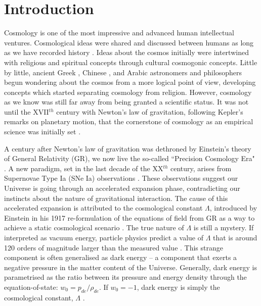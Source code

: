 %
\chapter{Introduction}
\label{sec:intro}


Cosmology is one of the most impressive and advanced human intellectual ventures. Cosmological ideas were shared and discussed between humans as long as we have recorded history \citep{preBabylonianCosmology,BabylonianCosmology1}. Ideas about the cosmos initially were intertwined with religious and spiritual concepts through cultural cosmogonic %
concepts. Little by little, ancient Greek \citep{GreekCosmology}, Chinese \citep{ChineseCosmology}, and Arabic \citep{ArabicCosmology} astronomers and philosophers begun wondering about the cosmos from a more logical point of view, developing concepts which started separating cosmology from religion. However, cosmology as we know was still far away from being granted a scientific status. It was not until the XVII$^{th}$ century with Newton's law of gravitation, following Kepler's remarks on planetary motion, that the cornerstone of cosmology as an empirical science was initially set \citep{Gleiser}.

\qquad A century after Newton's law of gravitation was dethroned by Einstein's theory of General Relativity (GR), we now live the so-called ``Precision Cosmology Era" \citep{2005PrecisionCosmology}. A new paradigm, set in the last decade of the XX$^{th}$ century, arises from Supernovae Type Ia (SNe Ia) observations \citep{1998Riess,1999Perlmutter}. These observations suggest our Universe is going through an accelerated expansion phase, contradicting our instincts about the nature of gravitational interaction. The cause of this accelerated expansion is attributed to the cosmological constant $\Lambda$, introduced by Einstein in his 1917 re-formulation of the equations of field from GR as a way to achieve a static cosmological scenario \citep{1917Einstein}. The true nature of $\Lambda$ is still a mystery. If interpreted as vacuum energy, particle physics predict a value of $\Lambda$ that is around 120 orders of magnitude larger than the measured value \citep{2018LambdaCentury}. This strange component is often generalised as dark energy -- a component that exerts a negative pressure in the matter content of the Universe. Generally, dark energy is parametrised as the ratio between its pressure and energy density through the equation-of-state: $w_0 = p_{de}/\rho_{de}$. If $w_0 = -1$, dark energy is simply the cosmological constant, $\Lambda$ .

